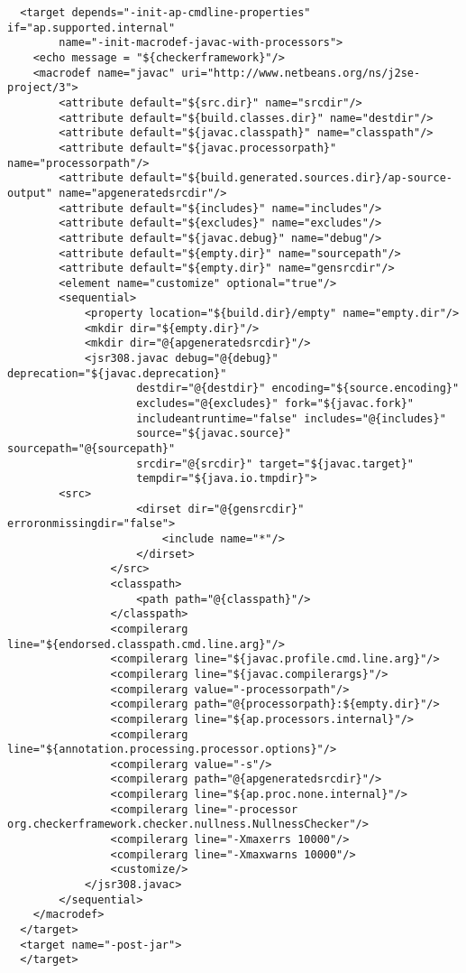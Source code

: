 \begin{enumerate}
\begin{smaller}
\begin{Verbatim}
  <target depends="-init-ap-cmdline-properties" if="ap.supported.internal"
        name="-init-macrodef-javac-with-processors">
    <echo message = "${checkerframework}"/>
    <macrodef name="javac" uri="http://www.netbeans.org/ns/j2se-project/3">
        <attribute default="${src.dir}" name="srcdir"/>
        <attribute default="${build.classes.dir}" name="destdir"/>
        <attribute default="${javac.classpath}" name="classpath"/>
        <attribute default="${javac.processorpath}" name="processorpath"/>
        <attribute default="${build.generated.sources.dir}/ap-source-output" name="apgeneratedsrcdir"/>
        <attribute default="${includes}" name="includes"/>
        <attribute default="${excludes}" name="excludes"/>
        <attribute default="${javac.debug}" name="debug"/>
        <attribute default="${empty.dir}" name="sourcepath"/>
        <attribute default="${empty.dir}" name="gensrcdir"/>
        <element name="customize" optional="true"/>
        <sequential>
            <property location="${build.dir}/empty" name="empty.dir"/>
            <mkdir dir="${empty.dir}"/>
            <mkdir dir="@{apgeneratedsrcdir}"/>
            <jsr308.javac debug="@{debug}" deprecation="${javac.deprecation}"
                    destdir="@{destdir}" encoding="${source.encoding}"
                    excludes="@{excludes}" fork="${javac.fork}"
                    includeantruntime="false" includes="@{includes}"
                    source="${javac.source}" sourcepath="@{sourcepath}"
                    srcdir="@{srcdir}" target="${javac.target}"
                    tempdir="${java.io.tmpdir}">
		<src>
                    <dirset dir="@{gensrcdir}" erroronmissingdir="false">
                        <include name="*"/>
                    </dirset>
                </src>
                <classpath>
                    <path path="@{classpath}"/>
                </classpath>
                <compilerarg line="${endorsed.classpath.cmd.line.arg}"/>
                <compilerarg line="${javac.profile.cmd.line.arg}"/>
                <compilerarg line="${javac.compilerargs}"/>
                <compilerarg value="-processorpath"/>
                <compilerarg path="@{processorpath}:${empty.dir}"/>
                <compilerarg line="${ap.processors.internal}"/>
                <compilerarg line="${annotation.processing.processor.options}"/>
                <compilerarg value="-s"/>
                <compilerarg path="@{apgeneratedsrcdir}"/>
                <compilerarg line="${ap.proc.none.internal}"/>
                <compilerarg line="-processor org.checkerframework.checker.nullness.NullnessChecker"/>
                <compilerarg line="-Xmaxerrs 10000"/>
                <compilerarg line="-Xmaxwarns 10000"/>
                <customize/>
            </jsr308.javac>
        </sequential>
    </macrodef>
  </target>
  <target name="-post-jar">
  </target>
\end{Verbatim}
\end{smaller}


\end{enumerate}
